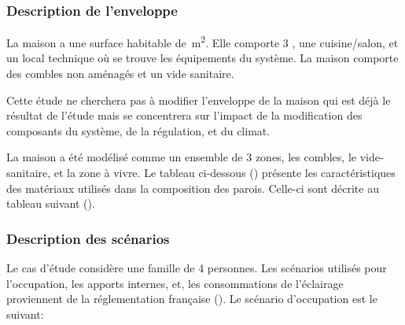 


\subsubsection{Description de l’enveloppe} %
\label{ssub:description_de_l_enveloppe}
La maison a une surface habitable de \,\si{m^2}. Elle comporte
3 , une cuisine/salon, et un local technique
où se trouve les équipements du système. La maison comporte des combles non aménagés
et un vide sanitaire.

Cette étude ne cherchera pas à modifier l’enveloppe de la maison qui est déjà le
résultat de l’étude  mais se concentrera
sur l’impact de la modification des composants du système, de la régulation, et du climat.

La maison a été modélisé comme un ensemble de 3 zones, les combles, le vide-sanitaire, et la zone
à vivre. Le tableau ci-dessous () présente les caractéristiques des matériaux utilisés
dans la composition des parois. Celle-ci sont décrite au tableau suivant ().




\subsubsection{Description des scénarios} %
\label{ssub:description_des_scenarios}
Le cas d’étude considère une famille de 4 personnes. Les scénarios utilisés pour
l’occupation, les apports internes, et, les consommations de l’éclairage proviennent
de la réglementation française ().
Le scénario d’occupation est le suivant:


